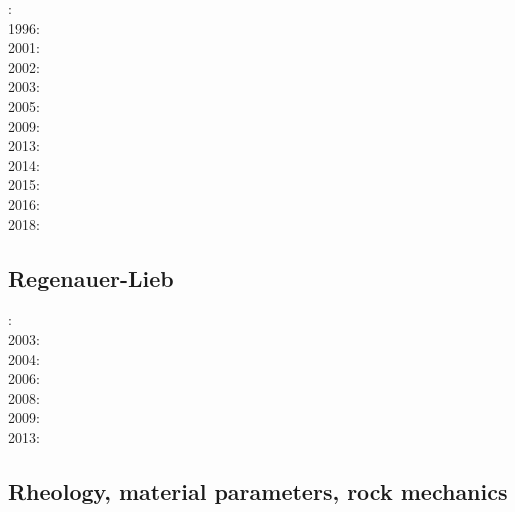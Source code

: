 : \cite{rich94}\\
1996: \cite{zhgm96}\\
2001: \cite{vapy01}\\
2002: \cite{foul02}\\
2003: \cite{vazh03}\\
2005: \cite{bugu05}\\
2009: \cite{bucl09}\\
2013: \cite{bemm13}\cite{brps13}\\
2014: \cite{buge14}\\
2015: \cite{gesb15}\cite{kocb15}\cite{meds15}\\
2016: \cite{fige16}\cite{gadb16}\\
2018: \cite{daga18}

\subsection*{Regenauer-Lieb}

: \cite{reyu00}\\
2003: \cite{reyu03}\\
2004: \cite{reyu04}\\
2006: \cite{rehy06}\cite{rewr06}\\
2008: \cite{rerw08}\\
2009: \cite{reps09}\\
2013: \cite{revp13}

\subsection*{Rheology, material parameters, rock mechanics}

